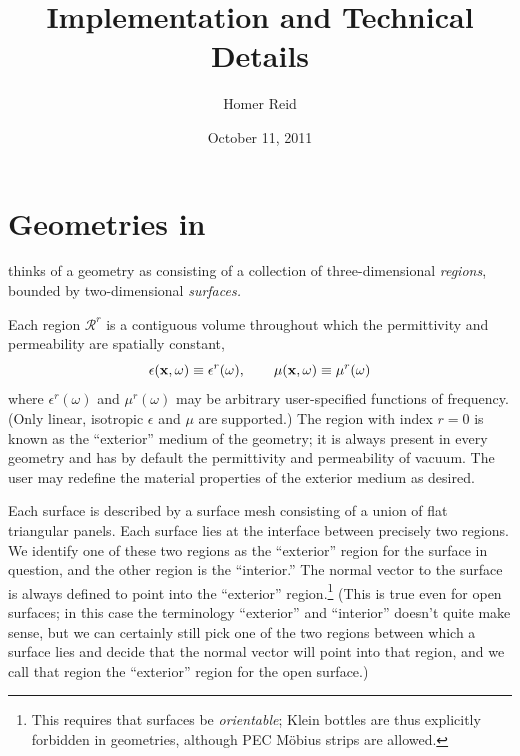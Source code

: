 \documentclass[letterpaper]{article}
\title {\lss Implementation and Technical Details}
\author {Homer Reid}
\date {October 11, 2011}
\begin{document}
\pagestyle{myheadings}
\maketitle

\tableofcontents

\newpage
\section{Geometries in \lss}

\lss thinks of a geometry as consisting of a collection
of three-dimensional \textit{regions}, bounded by 
two-dimensional \textit{surfaces.}

Each region $\mathcal{R}^r$ is a contiguous volume
throughout which the permittivity and permeability are 
spatially constant,
$$ \epsilon(\mathbf{x}, \omega) \equiv \epsilon^r(\omega), \qquad
   \mu(\mathbf{x}, \omega)      \equiv \mu^r(\omega)
$$
where $\epsilon^r(\omega)$ and $\mu^r(\omega)$ may
be arbitrary user-specified functions of frequency. 
(Only linear, isotropic $\epsilon$ and $\mu$ are supported.)
The region with index $r=0$ is known as the 
``exterior'' medium of the \lss geometry; it is 
always present in every \lss geometry and has by 
default the permittivity and permeability of vacuum. 
The user may redefine the material properties of the 
exterior medium as desired.

Each surface is described by a surface mesh consisting of 
a union of flat triangular panels. 
Each surface lies at the interface between precisely two 
regions. We identify one of these two regions as 
the ``exterior'' region for the surface in question,
and the other region is the ``interior.'' The normal 
vector to the surface is always defined to point into 
the ``exterior'' region.\footnote{This requires that 
surfaces be \textit{orientable}; Klein bottles are thus 
explicitly forbidden in \lss geometries, although PEC 
M\"obius strips are allowed.} (This is true even for 
open surfaces; in this case the terminology ``exterior'' 
and ``interior'' doesn't quite make sense, but we can 
certainly still pick one of the two regions between
which a surface lies and decide that the normal vector
will point into that region, and we call that region
the ``exterior'' region for the open surface.)
\end{document}
